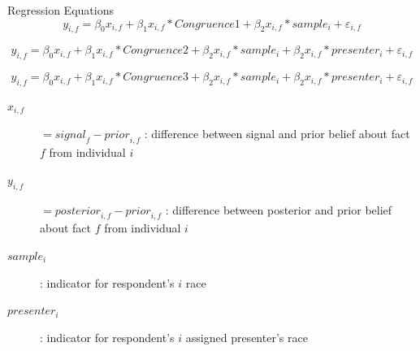 \documentclass[10pt]{beamer}
\begin{document}
\begin{frame}{Regression Equations}
    \begin{equation}
\label{reg:h1}
    y_{i,f} = \beta_0 x_{i,f}+  \beta_1 x_{i,f}*Congruence1 + \beta_2 x_{i,f}*sample_i + \varepsilon_{i,f}
  \end{equation}
  
\begin{equation}
\label{reg:h2}
    y_{i,f} = \beta_0 x_{i,f}+  \beta_1 x_{i,f} *Congruence2 + \beta_2 x_{i,f} *sample_i + \beta_2 x_{i,f} *presenter_i + \varepsilon_{i,f}
  \end{equation}
  
 \begin{equation}
\label{reg:h3}
    y_{i,f} = \beta_0 x_{i,f}+  \beta_1 x_{i,f}*Congruence3+ \beta_2 x_{i,f} *sample_i + \beta_2 x_{i,f} *presenter_i + \varepsilon_{i,f}
  \end{equation} 

        \begin{description}
\item[$x_{i,f}$] $= \textit{{signal}}_f - \textit{{prior}}_{i,f}$ : difference between signal and prior belief about fact $f$ from individual $i$

\item[$y_{i,f}$] $= \textit{posterior}_{i,f} - \textit{prior}_{i,f}$ : difference between posterior and prior belief about fact $f$ from individual $i$

\item[$sample_{i}$] : indicator for respondent's $i$ race 
\item[$presenter_{i}$] : indicator for respondent's $i$ assigned presenter's race 
      \end{description}
\hfill \hyperlink{eq_learning}
{}
\end{frame}
\end{document}
